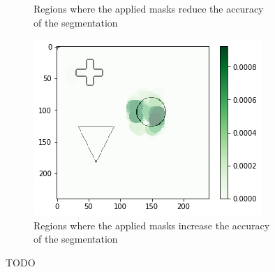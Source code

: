 \begin{figure}[H]
\begin{subfigure}[t]{.34\textwidth}
        \caption{Regions where the applied masks reduce the accuracy of the segmentation}
    \end{subfigure}\hfill%
    \begin{subfigure}[t]{.34\textwidth}
        \centering
        \includegraphics[width=\linewidth]{chapters/06_hdm/testnet/11.png}
        \caption{Regions where the applied masks increase the accuracy of the segmentation}
    \end{subfigure}
    \caption{TODO}
\end{figure}
